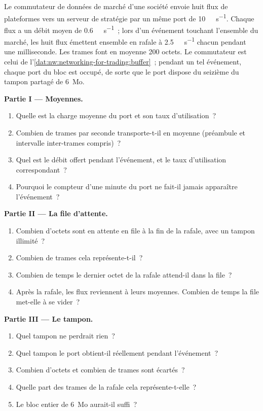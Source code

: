 \begin{problem}\label{pb:nw:networking-for-trading:1}
Le commutateur de données de marché d'une société envoie huit flux de plateformes vers un serveur de stratégie par un même port de \qty{10}{\giga\bit\per\second}. Chaque
flux a un débit moyen de \qty{0.6}{\giga\bit\per\second}~; lors d'un événement touchant l'ensemble du marché, les huit flux émettent ensemble en rafale à \qty{2.5}{\giga\bit\per\second}
chacun pendant une milliseconde. Les trames font en moyenne 200 octets. Le commutateur est celui de l'\cref{dat:nw:networking-for-trading:buffer}~; pendant
un tel événement, chaque port du bloc est occupé, de sorte que le port dispose du seizième du tampon partagé de 6~Mo.

\medskip\noindent\textbf{Partie I --- Moyennes.}
\begin{enumerate}
\item Quelle est la charge moyenne du port et son taux d'utilisation~?
\item Combien de trames par seconde transporte-t-il en moyenne (préambule et intervalle inter-trames compris)~?
\item Quel est le débit offert pendant l'événement, et le taux d'utilisation correspondant~?
\item Pourquoi le compteur d'une minute du port ne fait-il jamais apparaître l'événement~?
\end{enumerate}

\medskip\noindent\textbf{Partie II --- La file d'attente.}
\begin{enumerate}[resume]
\item Combien d'octets sont en attente en file à la fin de la rafale, avec un tampon illimité~?
\item Combien de trames cela représente-t-il~?
\item Combien de temps le dernier octet de la rafale attend-il dans la file~?
\item Après la rafale, les flux reviennent à leurs moyennes. Combien de temps la file met-elle à se vider~?
\end{enumerate}

\medskip\noindent\textbf{Partie III --- Le tampon.}
\begin{enumerate}[resume]
\item Quel tampon ne perdrait rien~?
\item Quel tampon le port obtient-il réellement pendant l'événement~?
\item Combien d'octets et combien de trames sont écartés~?
\item Quelle part des trames de la rafale cela représente-t-elle~?
\item Le bloc entier de 6~Mo aurait-il suffi~?
\end{enumerate}


\end{problem}
